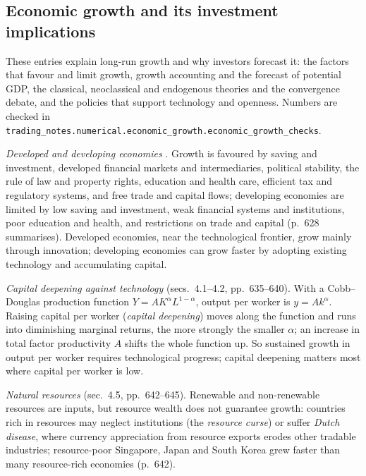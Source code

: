 \subsection{Economic growth and its investment implications}

These entries explain long-run growth and why investors forecast it: the factors that favour and limit growth, growth accounting and the forecast of potential GDP, the classical, neoclassical and endogenous theories and the convergence debate, and the policies that support technology and openness. Numbers are checked in \nolinkurl{trading_notes.numerical.economic_growth.economic_growth_checks}.

\begin{qfdefinition}\label{def:growth-determinants-factors}
 \emph{Developed and developing economies} \citep[chap.~11, sec.~2, pp.~622--631]{economics-investment-decision-makers-2013}. Growth is favoured by saving and investment, developed financial markets and intermediaries, political stability, the rule of law and property rights, education and health care, efficient tax and regulatory systems, and free trade and capital flows; developing economies are limited by low saving and investment, weak financial systems and institutions, poor education and health, and restrictions on trade and capital (p.~628 summarises). Developed economies, near the technological frontier, grow mainly through innovation; developing economies can grow faster by adopting existing technology and accumulating capital.

\emph{Capital deepening against technology} (secs.~4.1--4.2, pp.~635--640). With a Cobb--Douglas production function $Y=AK^\alpha L^{1-\alpha}$, output per worker is $y=Ak^\alpha$. Raising capital per worker (\emph{capital deepening}) moves along the function and runs into diminishing marginal returns, the more strongly the smaller $\alpha$; an increase in total factor productivity $A$ shifts the whole function up. So sustained growth in output per worker requires technological progress; capital deepening matters most where capital per worker is low.

\emph{Natural resources} (sec.~4.5, pp.~642--645). Renewable and non-renewable resources are inputs, but resource wealth does not guarantee growth: countries rich in resources may neglect institutions (the \emph{resource curse}) or suffer \emph{Dutch disease}, where currency appreciation from resource exports erodes other tradable industries; resource-poor Singapore, Japan and South Korea grew faster than many resource-rich economies (p.~642).


\end{qfdefinition}
